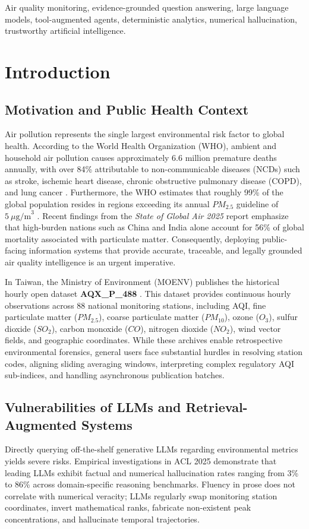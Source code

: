 \documentclass[conference]{IEEEtran}
\begin{document}
\begin{IEEEkeywords}
Air quality monitoring, evidence-grounded question answering, large language models, tool-augmented agents, deterministic analytics, numerical hallucination, trustworthy artificial intelligence.
\end{IEEEkeywords}

\section{Introduction}

\subsection{Motivation and Public Health Context}
Air pollution represents the single largest environmental risk factor to global health. According to the World Health Organization (WHO), ambient and household air pollution causes approximately 6.6 million premature deaths annually, with over 84\% attributable to non-communicable diseases (NCDs) such as stroke, ischemic heart disease, chronic obstructive pulmonary disease (COPD), and lung cancer \cite{who2025exposure}. Furthermore, the WHO estimates that roughly 99\% of the global population resides in regions exceeding its annual $PM_{2.5}$ guideline of $5\ \mu\text{g/m}^3$ \cite{who2021guidelines}. Recent findings from the \textit{State of Global Air 2025} report emphasize that high-burden nations such as China and India alone account for 56\% of global mortality associated with particulate matter. Consequently, deploying public-facing information systems that provide accurate, traceable, and legally grounded air quality intelligence is an urgent imperative.

In Taiwan, the Ministry of Environment (MOENV) publishes the historical hourly open dataset \textbf{AQX\_P\_488} \cite{moenv2026aqi_historical}. This dataset provides continuous hourly observations across 88 national monitoring stations, including AQI, fine particulate matter ($PM_{2.5}$), coarse particulate matter ($PM_{10}$), ozone ($O_3$), sulfur dioxide ($SO_2$), carbon monoxide ($CO$), nitrogen dioxide ($NO_2$), wind vector fields, and geographic coordinates. While these archives enable retrospective environmental forensics, general users face substantial hurdles in resolving station codes, aligning sliding averaging windows, interpreting complex regulatory AQI sub-indices, and handling asynchronous publication batches.

\subsection{Vulnerabilities of LLMs and Retrieval-Augmented Systems}
Directly querying off-the-shelf generative LLMs regarding environmental metrics yields severe risks. Empirical investigations in ACL 2025 demonstrate that leading LLMs exhibit factual and numerical hallucination rates ranging from 3\% to 86\% across domain-specific reasoning benchmarks. Fluency in prose does not correlate with numerical veracity; LLMs regularly swap monitoring station coordinates, invert mathematical ranks, fabricate non-existent peak concentrations, and hallucinate temporal trajectories.
\end{document}
